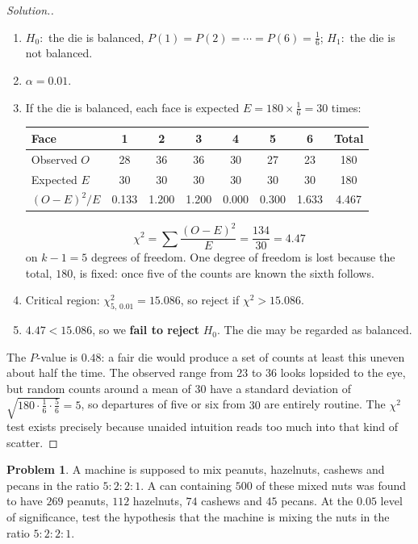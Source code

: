 \documentclass[11pt,a4paper]{article}
\theoremstyle{definition}
\newtheorem{problemx}{Problem}[section]
\newenvironment{problem}{\begin{problemx}}{\end{problemx}}
\newenvironment{solution}
  {\renewcommand{\qedsymbol}{}\begin{proof}[\textit{Solution}.]}
  {\end{proof}}
\begin{document}
\begin{solution}
\begin{enumerate}
\item $H_0:$ the die is balanced, $P(1)=P(2)=\cdots=P(6)=\frac{1}{6}$;
$H_1:$ the die is not balanced.
\item $\alpha=0.01$.
\item If the die is balanced, each face is expected $E=180\times\frac{1}{6}=30$ times:
\begin{table}[H]
\centering
\begin{tabular}{l|cccccc|c}
Face & 1 & 2 & 3 & 4 & 5 & 6 & Total\\
\hline
Observed $O$ & 28 & 36 & 36 & 30 & 27 & 23 & 180\\
Expected $E$ & 30 & 30 & 30 & 30 & 30 & 30 & 180\\
$(O-E)^2/E$ & 0.133 & 1.200 & 1.200 & 0.000 & 0.300 & 1.633 & 4.467\\
\end{tabular}
\end{table}
\[\chi^2=\sum\frac{(O-E)^2}{E}=\frac{134}{30}=4.47\]
on $k-1=5$ degrees of freedom. One degree of freedom is lost because the total, $180$, is
fixed: once five of the counts are known the sixth follows.
\item Critical region: $\chi^2_{5,\,0.01}=15.086$, so reject if $\chi^2>15.086$.
\item $4.47<15.086$, so we \textbf{fail to reject} $H_0$. The die may be regarded as
balanced.
\end{enumerate}

The $P$-value is $0.48$: a fair die would produce a set of counts at least this uneven about
half the time. The observed range from $23$ to $36$ looks lopsided to the eye, but random
counts around a mean of $30$ have a standard deviation of $\sqrt{180\cdot\frac{1}{6}\cdot
\frac{5}{6}}=5$, so departures of five or six from $30$ are entirely routine. The
$\chi^2$ test exists precisely because unaided intuition reads too much into that kind of
scatter.
\end{solution}

\begin{problem}
A machine is supposed to mix peanuts, hazelnuts, cashews and pecans in the ratio
$5:2:2:1$. A can containing $500$ of these mixed nuts was found to have $269$ peanuts,
$112$ hazelnuts, $74$ cashews and $45$ pecans. At the $0.05$ level of significance, test the
hypothesis that the machine is mixing the nuts in the ratio $5:2:2:1$.
\end{problem}
\end{document}
